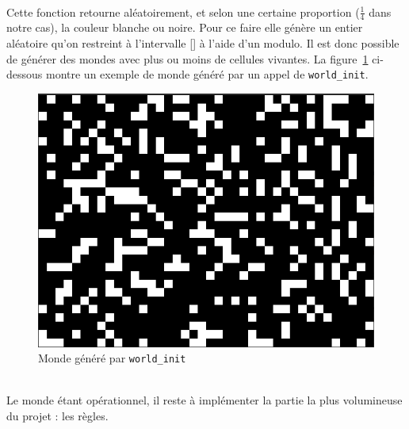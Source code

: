 \documentclass[a4paper]{article}
\begin{document}
\\Cette fonction retourne aléatoirement, et selon une certaine proportion (\(\frac{1}{4}\) dans notre cas), la couleur blanche ou noire. Pour ce faire elle génère un entier aléatoire qu'on restreint à l'intervalle [\![0 ; 3]\!] à l'aide d'un modulo. Il est donc possible de générer des mondes avec plus ou moins de cellules vivantes. La figure~\ref{fig:world_gol} ci-dessous montre un exemple de monde généré par un appel de \texttt{world\_init}.
\begin{figure}[htb]
    \centering
    \includegraphics[scale=0.3]{img/monde_gol.png}
    \caption{Monde généré par \texttt{world\_init}}
    \label{fig:world_gol}
\end{figure}
\\
\indent Le monde étant opérationnel, il reste à implémenter la partie la plus volumineuse du projet : les règles.
\end{document}
